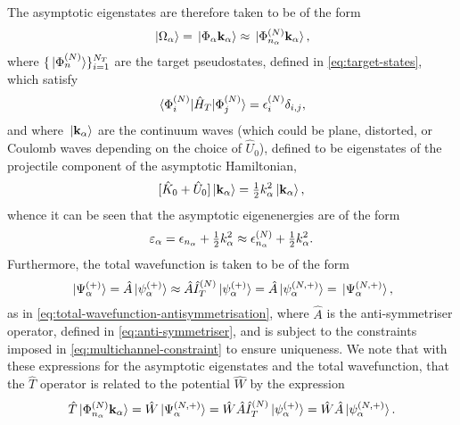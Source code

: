 \documentclass[draft]{article}
\begin{document}
The asymptotic eigenstates are therefore taken to be of the form
\begin{equation}
  \label{eq:ccc-asymptotic-states}
  \ket*{\Omega_{\alpha}}
  =
  \ket*{\Phi_{\alpha} \vb{k}_{\alpha}}
  \approx
  \ket*{\Phi_{n_{\alpha}}^{(N)} \vb{k}_{\alpha}}
  ,
\end{equation}
where $\lbrace\ket*{\Phi_{n}^{(N)}}\rbrace_{i = 1}^{N_{T}}$ are the target
pseudostates, defined in \autoref{eq:target-states}, which satisfy
\begin{equation}
  \label{eq:ccc-target}
  \mel*
  {\Phi_{i}^{(N)}}
  {\hat{H}_{T}}
  {\Phi_{j}^{(N)}}
  =
  \epsilon_{i}^{(N)}
  \delta_{i, j}
  ,
\end{equation}
and where $\ket*{\vb{k}_{\alpha}}$ are the continuum waves (which could be
plane, distorted, or Coulomb waves depending on the choice of $\hat{U}_{0}$),
defined to be eigenstates of the projectile component of the asymptotic
Hamiltonian,
\begin{equation}
  \label{eq:ccc-waves}
  [
    \hat{K}_{0}
    +
    \hat{U}_{0}
  ]
  \ket*{\vb{k}_{\alpha}}
  =
  \tfrac{1}{2}
  k_{\alpha}^{2}
  \ket*{\vb{k}_{\alpha}}
  ,
\end{equation}
whence it can be seen that the asymptotic eigenenergies are of the form
\begin{equation}
  \label{eq:ccc-asymptotic-energy}
  \varepsilon_{\alpha}
  =
  \epsilon_{n_{\alpha}}
  +
  \tfrac{1}{2}
  k_{\alpha}^{2}
  \approx
  \epsilon_{n_{\alpha}}^{(N)}
  +
  \tfrac{1}{2}
  k_{\alpha}^{2}
  .
\end{equation}
Furthermore, the total wavefunction is taken to be of the form
\begin{equation}
  \label{eq:ccc-total-wavefunction}
  \ket*{\Psi_{\alpha}^{(+)}}
  =
  \hat{A}
  \ket*{\psi_{\alpha}^{(+)}}
  \approx
  \hat{A}
  \hat{I}_{T}^{(N)}
  \ket*{\psi_{\alpha}^{(+)}}
  =
  \hat{A}
  \ket*{\psi_{\alpha}^{(N, +)}}
  =
  \ket*{\Psi_{\alpha}^{(N, +)}}
  ,
\end{equation}
as in \autoref{eq:total-wavefunction-antisymmetrisation}, where $\hat{A}$ is the
anti-symmetriser operator, defined in \autoref{eq:anti-symmetriser}, and is
subject to the constraints imposed in \autoref{eq:multichannel-constraint} to
ensure uniqueness.
We note that with these expressions for the asymptotic eigenstates and the total
wavefunction, that the $\hat{T}$ operator is related to the potential $\hat{W}$
by the expression
\begin{equation}
  \label{eq:ccc-t-w}
  \hat{T}
  \ket*{\Phi_{n_{\alpha}}^{(N)} \vb{k}_{\alpha}}
  =
  \hat{W}
  \ket*{\Psi_{\alpha}^{(N, +)}}
  =
  \hat{W}
  \hat{A}
  \hat{I}_{T}^{(N)}
  \ket*{\psi_{\alpha}^{(+)}}
  =
  \hat{W}
  \hat{A}
  \ket*{\psi_{\alpha}^{(N, +)}}
  .
\end{equation}
\end{document}
